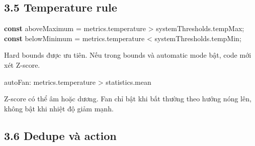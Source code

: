 \documentclass[11pt,oneside,openany]{book}
\newenvironment{Shaded}{\begin{snugshade}}{\end{snugshade}}
\newcommand{\AttributeTok}[1]{\textcolor[rgb]{0.16,0.50,0.73}{#1}}
\newcommand{\ControlFlowTok}[1]{\textcolor[rgb]{0.99,0.74,0.29}{\textbf{#1}}}
\newcommand{\FunctionTok}[1]{\textcolor[rgb]{0.56,0.27,0.68}{#1}}
\newcommand{\KeywordTok}[1]{\textcolor[rgb]{0.81,0.81,0.76}{\textbf{#1}}}
\newcommand{\NormalTok}[1]{\textcolor[rgb]{0.81,0.81,0.76}{#1}}
\newcommand{\OperatorTok}[1]{\textcolor[rgb]{0.81,0.81,0.76}{#1}}
\newcommand{\SpecialCharTok}[1]{\textcolor[rgb]{0.24,0.68,0.91}{#1}}
\newcommand{\VerbatimStringTok}[1]{\textcolor[rgb]{0.85,0.27,0.33}{#1}}
\renewenvironment{Shaded}{%
  \def\FrameCommand{\fboxsep=8pt\colorbox{shadecolor}}%
  \MakeFramed{\advance\hsize-\width\FrameRestore}%
}{\endMakeFramed}
\begin{document}
\subsection{3.5 Temperature rule}\label{35-temperature-rule}

\begin{Shaded}
\begin{Highlighting}[]
\KeywordTok{const}\NormalTok{ aboveMaximum }\OperatorTok{=}\NormalTok{ metrics}\OperatorTok{.}\AttributeTok{temperature} \OperatorTok{\textgreater{}}\NormalTok{ systemThresholds}\OperatorTok{.}\AttributeTok{tempMax}\OperatorTok{;}
\KeywordTok{const}\NormalTok{ belowMinimum }\OperatorTok{=}\NormalTok{ metrics}\OperatorTok{.}\AttributeTok{temperature} \OperatorTok{\textless{}}\NormalTok{ systemThresholds}\OperatorTok{.}\AttributeTok{tempMin}\OperatorTok{;}
\end{Highlighting}
\end{Shaded}

Hard bounds được ưu tiên. Nếu trong bounds và automatic mode bật, code
mới xét Z-score.

\begin{Shaded}
\begin{Highlighting}[]
\NormalTok{autoFan}\OperatorTok{:}\NormalTok{ metrics}\OperatorTok{.}\AttributeTok{temperature} \OperatorTok{\textgreater{}}\NormalTok{ statistics}\OperatorTok{.}\AttributeTok{mean}
\end{Highlighting}
\end{Shaded}

Z-score có thể âm hoặc dương. Fan chỉ bật khi bất thường theo hướng nóng
lên, không bật khi nhiệt độ giảm mạnh.

\subsection{3.6 Dedupe và action}\label{36-dedupe-vuxe0-action}

\begin{Shaded}
\end{Shaded}
\end{document}
